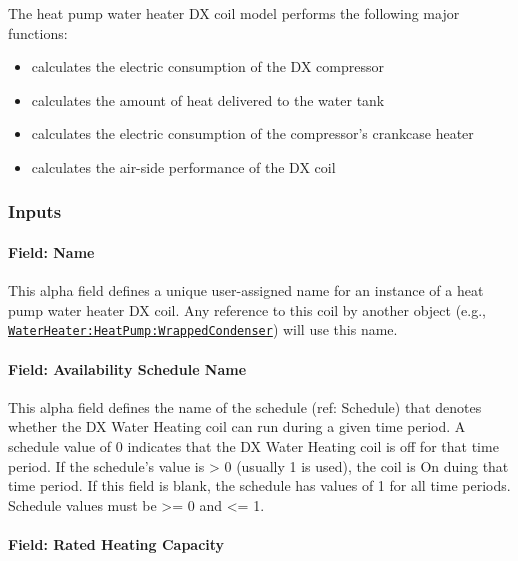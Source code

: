 The heat pump water heater DX coil model performs the following major functions:

\begin{itemize}
\item
  calculates the electric consumption of the DX compressor
\item
  calculates the amount of heat delivered to the water tank
\item
  calculates the electric consumption of the compressor's crankcase heater
\item
  calculates the air-side performance of the DX coil
\end{itemize}

\subsubsection{Inputs}\label{inputs-28}

\paragraph{Field: Name}\label{field-name-27-000}

This alpha field defines a unique user-assigned name for an instance of a heat pump water heater DX coil. Any reference to this coil by another object (e.g., \hyperref[waterheaterheatpumpwrappedcondenser]{\lstinline!WaterHeater:HeatPump:WrappedCondenser!}) will use this name.

\paragraph{Field: Availability Schedule Name}\label{field-availability-schedule-name-16-004}

This alpha field defines the name of the schedule (ref: Schedule) that denotes whether the DX Water Heating coil can run during a given time period. A schedule value of 0 indicates that the DX Water Heating coil is off for that time period. If the schedule's value is \textgreater{} 0 (usually 1 is used), the coil is On duing that time period. If this field is blank, the schedule has values of 1 for all time periods. Schedule values must be \textgreater{}= 0 and \textless{}= 1.

\paragraph{Field: Rated Heating Capacity}\label{field-rated-heating-capacity-1}

